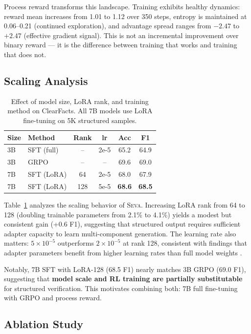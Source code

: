 \documentclass[11pt]{article}
\newcommand{\seva}{\textsc{Seva}\xspace}
\newcommand{\realnumber}[1]{\textbf{#1}}
\begin{document}
Process reward transforms this landscape.
Training exhibits healthy dynamics: reward mean increases from 1.01 to 1.12 over 350 steps, entropy is maintained at 0.06--0.21 (continued exploration), and advantage spread ranges from $-2.47$ to $+2.47$ (effective gradient signal).
This is not an incremental improvement over binary reward --- it is the difference between training that works and training that does not.


\subsection{Scaling Analysis}
\label{sec:scaling}

\begin{table}[t]
\centering
\small
\caption{Effect of model size, LoRA rank, and training method on ClearFacts. All 7B models use LoRA fine-tuning on 5K structured samples.}
\label{tab:scaling}
\setlength{\tabcolsep}{3.5pt}
\begin{tabular}{llcccc}
\toprule
\textbf{Size} & \textbf{Method} & \textbf{Rank} & \textbf{lr} & \textbf{Acc} & \textbf{F1} \\
\midrule
3B & SFT (full) & -- & 2e-5 & 65.2 & 64.9 \\
3B & GRPO & -- & -- & 69.6 & 69.0 \\
\midrule
7B & SFT (LoRA) & 64 & 2e-5 & 68.0 & 67.9 \\
7B & SFT (LoRA) & 128 & 5e-5 & \realnumber{68.6} & \realnumber{68.5} \\
\bottomrule
\end{tabular}
\end{table}

Table~\ref{tab:scaling} analyzes the scaling behavior of \seva.
Increasing LoRA rank from 64 to 128 (doubling trainable parameters from 2.1\% to 4.1\%) yields a modest but consistent gain (+0.6 F1), suggesting that structured output requires sufficient adapter capacity to learn multi-component generation.
The learning rate also matters: $5\times10^{-5}$ outperforms $2\times10^{-5}$ at rank 128, consistent with findings that adapter parameters benefit from higher learning rates than full model weights \citep{hu2022lora}.

Notably, 7B SFT with LoRA-128 (68.5 F1) nearly matches 3B GRPO (69.0 F1), suggesting that \textbf{model scale and RL training are partially substitutable} for structured verification.
This motivates combining both: 7B full fine-tuning with GRPO and process reward.


\subsection{Ablation Study}
\end{document}
